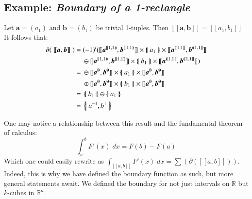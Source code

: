 \subsection{Example: \emph{Boundary of a 1-rectangle}}
Let $\boldsymbol{a}= (a_1)$ and $\boldsymbol{b} = (b_1)$ be trivial 1-tuples. 
Then $[\![\boldsymbol{a}, \boldsymbol{b}]\!] = [\![a_1, b_1]\!]$
It follows that:
\begin{align*}
	\partial ( \; [\![ \boldsymbol{a}, \boldsymbol{b} ]\!] \; )
	=& \; (-1)^i ( [\![\boldsymbol{a}^{[\![1,1)\!)}, \boldsymbol{b}^{[\![1,1)\!)} ]\!]
	\times \hset{a_1} \times
	[\![\boldsymbol{a}^{(\!(1,1]\!]}, \boldsymbol{b}^{(\!(1,1]\!]} ]\!]\\
	&\; \ominus
	[\![\boldsymbol{a}^{[\![1,1)\!)}, \boldsymbol{b}^{[\![1,1)\!)} ]\!]
	\times \hset{b_1} \times
	[\![\boldsymbol{a}^{(\!(1,1]\!]}, \boldsymbol{b}^{(\!(1,1]\!]} ]\!] )\\
	=& \; \ominus [\![\boldsymbol{a}^{\emptyset}, \boldsymbol{b}^{\emptyset} ]\!]
	\times \hset{a_1} \times
	[\![\boldsymbol{a}^{\emptyset}, \boldsymbol{b}^{\emptyset} ]\!]\\
	& \; \oplus
	[\![\boldsymbol{a}^{\emptyset}, \boldsymbol{b}^{\emptyset} ]\!]
	\times \hset{b_1} \times
	[\![\boldsymbol{a}^{\emptyset}, \boldsymbol{b}^{\emptyset} ]\!] \\
	=& \; \hset{b_1} \ominus \hset{a_1} \\
	=& \; \hset{a^{-1}, b^{1}}
\end{align*}

One may notice a relationship between this result and the fundamental theorem of calculus:
\begin{equation}
	\int_a^b F'(x) \; dx = F(b) - F(a)
\end{equation}
Which one could easily rewrite as $\int_{[\![a,b]\!]} F'(x) \; dx = \sum (\partial([\![a,b]\!]))$.
Indeed, this is why we have defined the boundary function as such, but more general statements await.
We defined the boundary for not just intervals on $\mathbb{R}$ but $k$-cubes in $\mathbb{R}^n$.





